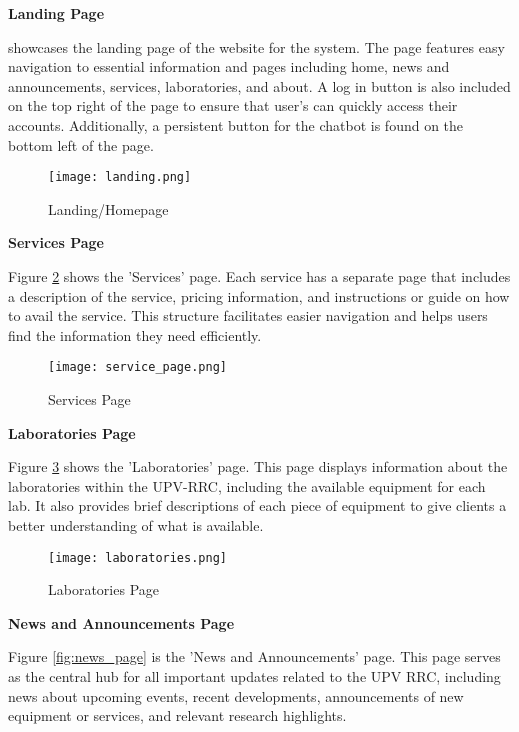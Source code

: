 \noindent\textbf{Landing Page}

 showcases the landing page of the website for the system. The page features easy navigation to essential information and pages including home, news and announcements, services, laboratories, and about. A log in button is also included on the top right of the page to ensure that user's can quickly access their accounts. Additionally, a persistent button for the chatbot is found on the bottom left of the page. 

\newpage

\begin{figure}[h]
	\centering 
	\texttt{[image: landing.png]}
	\caption{Landing/Homepage}
	\label{fig:landing}
\end{figure}

\noindent\textbf{Services Page}

Figure \ref{fig:service_page} shows the 'Services' page. Each service has a separate page that includes a description of the service, pricing information, and instructions or guide on how to avail the service. This structure facilitates easier navigation and helps users find the information they need efficiently.

\begin{figure}[h]
	\centering
	\texttt{[image: service\_page.png]}
	\caption{Services Page}
	\label{fig:service_page}
\end{figure}

\newpage

\noindent\textbf{Laboratories Page}

Figure \ref{fig:laboratories_page} shows the 'Laboratories' page. This page displays information about the laboratories within the UPV-RRC, including the available equipment for each lab. It also provides brief descriptions of each piece of equipment to give clients a better understanding of what is available.

\begin{figure}[h]
	\centering
	\texttt{[image: laboratories.png]}
	\caption{Laboratories Page}
	\label{fig:laboratories_page}
\end{figure}

\newpage

\noindent\textbf{News and Announcements Page}

Figure \ref{fig:news_page} is the 'News and Announcements' page. This page serves as the central hub for all important updates related to the UPV RRC, including news about upcoming events, recent developments, announcements of new equipment or services, and relevant research highlights.

